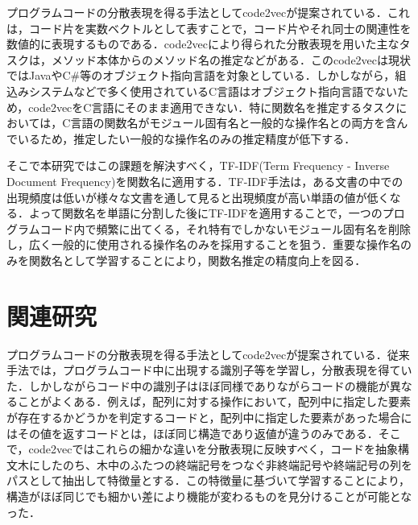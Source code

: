 \documentclass[submit,techrep,noauthor]{ipsj}
\begin{document}
プログラムコードの分散表現を得る手法としてcode2vec\cite{alon2019code2vec}が提案されている．これは，コード片を実数ベクトルとして表すことで，コード片やそれ同士の関連性を数値的に表現するものである．code2vecにより得られた分散表現を用いた主なタスクは，メソッド本体からのメソッド名の推定などがある．このcode2vecは現状ではJavaやC\#等のオブジェクト指向言語を対象としている．しかしながら，組込みシステムなどで多く使用されているC言語はオブジェクト指向言語でないため，code2vecをC言語にそのまま適用できない．特に関数名を推定するタスクにおいては，C言語の関数名がモジュール固有名と一般的な操作名との両方を含んでいるため，推定したい一般的な操作名のみの推定精度が低下する．

そこで本研究ではこの課題を解決すべく，TF-IDF(Term Frequency - Inverse Document Frequency)\cite{ramos2003using}を関数名に適用する．TF-IDF手法は，ある文書の中での出現頻度は低いが様々な文書を通して見ると出現頻度が高い単語の値が低くなる．よって関数名を単語に分割した後にTF-IDFを適用することで，一つのプログラムコード内で頻繁に出てくる，それ特有でしかないモジュール固有名を削除し，広く一般的に使用される操作名のみを採用することを狙う．重要な操作名のみを関数名として学習することにより，関数名推定の精度向上を図る．




\section{関連研究}

プログラムコードの分散表現を得る手法としてcode2vec\cite{alon2019code2vec}が提案されている．従来手法では，プログラムコード中に出現する識別子等を学習し，分散表現を得ていた．しかしながらコード中の識別子はほぼ同様でありながらコードの機能が異なることがよくある．例えば，配列に対する操作において，配列中に指定した要素が存在するかどうかを判定するコードと，配列中に指定した要素があった場合にはその値を返すコードとは，ほぼ同じ構造であり返値が違うのみである．そこで，code2vecではこれらの細かな違いを分散表現に反映すべく，コードを抽象構文木にしたのち、木中のふたつの終端記号をつなぐ非終端記号や終端記号の列をパスとして抽出して特徴量とする．この特徴量に基づいて学習することにより，構造がほぼ同じでも細かい差により機能が変わるものを見分けることが可能となった．
\end{document}
